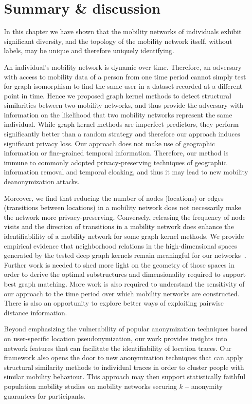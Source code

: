 \section{Summary \& discussion} %

In this chapter we have shown that the mobility networks of individuals exhibit significant diversity, and the topology of the mobility network itself, without labels, may be unique and therefore uniquely identifying.

An individual's mobility network is dynamic over time.
Therefore, an adversary with access to mobility data of a person from one time period cannot simply test for graph isomorphism to find the same user in a dataset recorded at a different point in time.
Hence we proposed graph kernel methods to detect structural similarities between two mobility networks, and thus provide the adversary with information on the likelihood that two mobility networks represent the same individual.
While graph kernel methods are imperfect predictors, they perform significantly better than a random strategy and therefore our approach induces significant privacy loss.
Our approach does not make use of geographic information or fine-grained temporal information. Therefore, our method is immune to commonly adopted privacy-preserving techniques of geographic information removal and temporal cloaking, and thus it may lead to new mobility deanonymization attacks.

Moreover, we find that reducing the number of nodes (locations) or edges (transitions between locations) in a mobility network does not necessarily make the network more privacy-preserving.
Conversely, releasing the frequency of node visits and the direction of transitions in a mobility network does enhance the identifiablility of a mobility network for some graph kernel methods.
We provide empirical evidence that neighborhood relations in the high-dimensional spaces generated by the tested deep graph kernels remain meaningful for our networks~\citep{Beyer}.
Further work is needed to shed more light on the geometry of those spaces in order to derive the optimal substructures and dimensionality required to support best graph matching.
More work is also required to understand the sensitivity of our approach to the time period over which mobility networks are constructed.
There is also an opportunity to explore better ways of exploiting pairwise distance information.

Beyond emphasizing the vulnerability of popular anonymization techniques based on user-specific location pseudonymization, our work provides insights into network features that can facilitate the identifiability of location traces.
Our framework also opens the door to new anonymization techniques that can apply structural similarity methods to individual traces in order to cluster people with similar mobility behaviour.
This approach may then support statistically faithful population mobility studies on mobility networks securing $k-$anonymity guarantees for participants.

